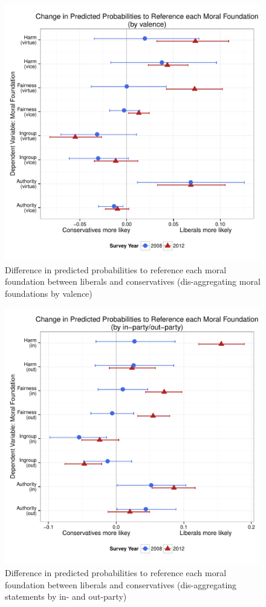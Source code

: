 \documentclass[12pt]{article}
\begin{document}
\begin{figure}\centering
\includegraphics[scale=.4]{../calc/fig/appD4val.pdf}
\caption{Difference in predicted probabilities to reference each moral foundation between liberals and conservatives (dis-aggregating moral foundations by valence)}\label{fig:appD4val}
\end{figure}

\begin{figure}\centering
\includegraphics[scale=.4]{../calc/fig/appD5inout.pdf}
\caption{Difference in predicted probabilities to reference each moral foundation between liberals and conservatives (dis-aggregating statements by in- and out-party)}\label{fig:appD5inout}
\end{figure}
\end{document}
